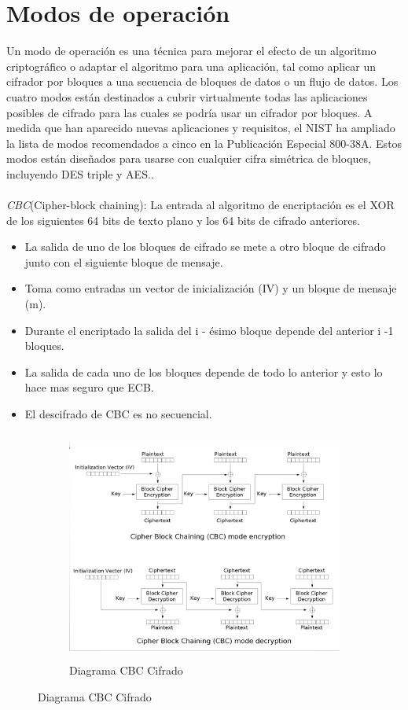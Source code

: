 \section{Modos de operación}
Un modo de operación es una técnica para mejorar el efecto de un algoritmo criptográfico o adaptar el algoritmo para una aplicación, tal como aplicar un cifrador por bloques a una secuencia de bloques de datos o un flujo de datos. Los cuatro modos están destinados a cubrir virtualmente todas las aplicaciones posibles de cifrado para las cuales se podría usar un cifrador por bloques. A medida que han aparecido nuevas aplicaciones y requisitos, el NIST ha ampliado la lista de modos recomendados a cinco en la Publicación Especial 800-38A. Estos modos están diseñados para usarse con cualquier cifra simétrica de bloques, incluyendo DES triple y AES..\\\\


\textit{CBC}(Cipher-block chaining): La entrada al algoritmo de encriptación es el XOR de los siguientes 64 bits de texto plano y los 64 bits de cifrado anteriores.\\
\begin{itemize}
	\item La salida de uno de los bloques de cifrado se mete a otro bloque de cifrado junto con el siguiente bloque de mensaje.
	\item Toma como entradas un vector de inicialización (IV) y un bloque de mensaje (m).
	\item Durante el encriptado la salida del i - ésimo bloque depende del anterior i -1 bloques.
	\item La salida de cada uno de los bloques depende de todo lo anterior y esto lo hace mas seguro que ECB.
	\item  El descifrado de CBC es no secuencial.
\end{itemize}

\begin{figure}[h]
    \centering
    \begin{subfigure}[t]{0.5\textwidth}
        \centering
        \includegraphics[height=3in]{./images/CBC.png}
        \caption{Diagrama CBC Cifrado}
        \label{fig:1-3-1}
    \end{subfigure}
\end{figure}
\pagebreak

